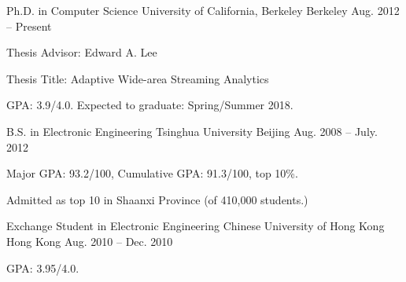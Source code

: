 

\begin{cventries}

  \cventry
  {Ph.D. in Computer Science}
  {University of California, Berkeley}
  {Berkeley}
  {Aug. 2012 -- Present}
  {
    \begin{cvitems}
    \item Thesis Advisor: Edward A. Lee
    \item Thesis Title: Adaptive Wide-area Streaming Analytics
    \item GPA: 3.9/4.0. Expected to graduate: Spring/Summer 2018.
    \end{cvitems}
  }

  \cventry
  {B.S. in Electronic Engineering}
  {Tsinghua University}
  {Beijing}
  {Aug. 2008 -- July. 2012}
  {
    \begin{cvitems}
    \item{Major GPA: 93.2/100, Cumulative GPA: 91.3/100, top 10\%.}
    \item{Admitted as top 10 in Shaanxi Province (of 410,000 students.)}
    \end{cvitems}
  }

  \cventry
  {Exchange Student in Electronic Engineering}
  {Chinese University of Hong Kong}
  {Hong Kong}
  {Aug. 2010 -- Dec. 2010}
  {
    \begin{cvitems}
    \item {GPA: 3.95/4.0.}
    \end{cvitems}
  }

\end{cventries}

